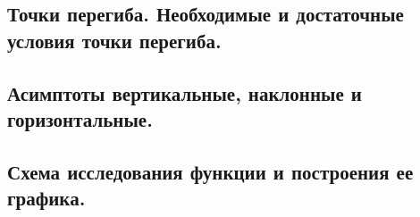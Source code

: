 \documentclass[a4paper,12pt]{article}
\theoremstyle{plain} %
\theoremstyle{definition} %
\theoremstyle{remark} %
\begin{document}
\begin{center}
\subsection*{Точки перегиба. Необходимые и достаточные условия точки перегиба.                                        }
\end{center}

\begin{center}
\subsection*{Асимптоты вертикальные, наклонные и горизонтальные.                                                      }
\end{center}

\begin{center}
\subsection*{Схема исследования функции и построения ее графика.                                                      }
\end{center}
\end{document}
